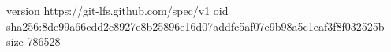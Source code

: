 version https://git-lfs.github.com/spec/v1
oid sha256:8de99a66cdd2c8927e8b25896e16d07addfc5af07e9b98a5c1eaf3f8f032525b
size 786528
